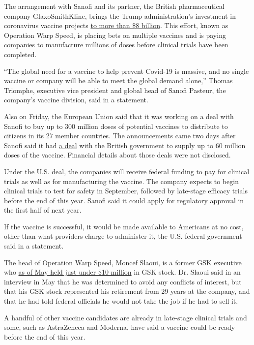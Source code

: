 The arrangement with Sanofi and its partner, the British pharmaceutical
company GlaxoSmithKline, brings the Trump administration's investment in
coronavirus vaccine projects
\href{https://medicalcountermeasures.gov/app/barda/coronavirus/COVID19.aspx?filter=vaccine}{to
more than \$8 billion}. This effort, known as Operation Warp Speed, is
placing bets on multiple vaccines and is paying companies to manufacture
millions of doses before clinical trials have been completed.

``The global need for a vaccine to help prevent Covid-19 is massive, and
no single vaccine or company will be able to meet the global demand
alone,'' Thomas Triomphe, executive vice president and global head of
Sanofi Pasteur, the company's vaccine division, said in a statement.

Also on Friday, the European Union said that it was working on a deal
with Sanofi to buy up to 300 million doses of potential vaccines to
distribute to citizens in its 27 member countries. The announcements
came two days after Sanofi said it had
\href{https://www.sanofi.com/en/media-room/press-releases/2020/2020-07-29-07-00-00}{a
deal} with the British government to supply up to 60 million doses of
the vaccine. Financial details about those deals were not disclosed.

Under the U.S. deal, the companies will receive federal funding to pay
for clinical trials as well as for manufacturing the vaccine. The
company expects to begin clinical trials to test for safety in
September, followed by late-stage efficacy trials before the end of this
year. Sanofi said it could apply for regulatory approval in the first
half of next year.

If the vaccine is successful, it would be made available to Americans at
no cost, other than what providers charge to administer it, the U.S.
federal government said in a statement.

The head of Operation Warp Speed, Moncef Slaoui, is a former GSK
executive who
\href{https://www.nytimes.com/2020/05/20/health/coronavirus-vaccine-czar.html}{as
of May held just under \$10 million} in GSK stock. Dr. Slaoui said in an
interview in May that he was determined to avoid any conflicts of
interest, but that his GSK stock represented his retirement from 29
years at the company, and that he had told federal officials he would
not take the job if he had to sell it.

A handful of other vaccine candidates are already in late-stage clinical
trials and some, such as AstraZeneca and Moderna, have said a vaccine
could be ready before the end of this year.

